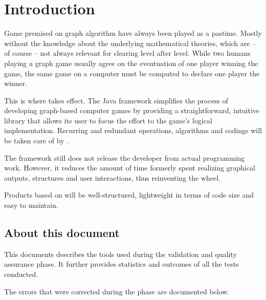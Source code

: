 \section{Introduction}
Game premised on graph algorithm have always been played as a pastime. Mostly without the knowledge about the underlying mathematical theories, which are -- of course -- not always relevant for clearing level after level. While two humans playing a graph game usually agree on the eventuation of one player winning the game, the same game on a computer must be computed to declare one player the winner.\par

This is where \graphioli takes effect. The Java framework simplifies the process of developing graph-based computer games by providing a straightforward, intuitive library that allows its user to focus the effort to the game's logical implementation. Recurring and redundant operations, algorithms and codings will be taken care of by \graphioli.\par

The framework still does not release the developer from actual programming work. However, it reduces the amount of time formerly spent realizing graphical outputs, structures and user interactions, thus reinventing the wheel.\par

Products based on \graphioli will be well-structured, lightweight in terms of code size and easy to maintain.\par

\subsection{About this document}
This documents describes the tools used during the validation and quality assurance phase. It further provides statistics and outcomes of all the tests conducted.\par
The errors that were corrected during the phase are documented below.\par